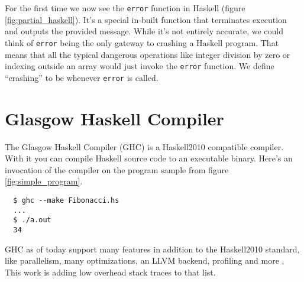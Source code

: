\begin{figure}
\end{figure}

For the first time we now see the \texttt{error} function in Haskell (figure \ref{fig:partial_haskell}).  It's a
special in-built function that terminates execution and outputs the provided
message. While it's not entirely accurate, we could think of \texttt{error}
being the only gateway to crashing a Haskell program. That means that all the
typical dangerous operations like integer division by zero or indexing outside
an array would just invoke the \texttt{error} function. We define ``crashing''
to be whenever \texttt{error} is called.

\section{Glasgow Haskell Compiler}

The Glasgow Haskell Compiler (GHC) is a Haskell2010 compatible compiler.
\cite{ghc_website} With it you can compile Haskell source code to an executable
binary. Here's an invocation of the compiler on the program sample from figure \ref{fig:simple_program}.

\begin{verbatim}
  $ ghc --make Fibonacci.hs
  ...
  $ ./a.out
  34
\end{verbatim}

GHC as of today support many features in addition to the Haskell2010
standard, like parallelism, many optimizations, an LLVM backend, profiling
and more \cite{ghc_website}. This
work is adding low overhead stack traces to that list.


